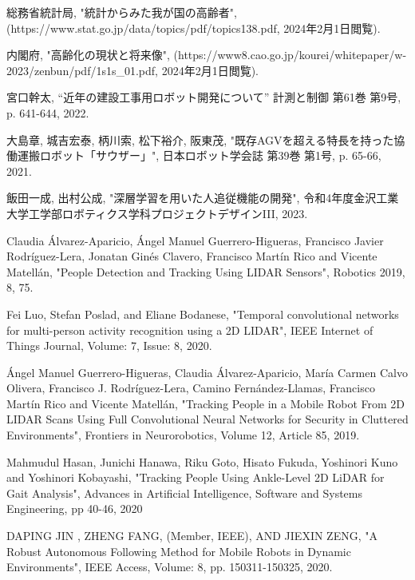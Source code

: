 \begin{thebibliography}{99}
    総務省統計局, "統計からみた我が国の高齢者", (https://www.stat.go.jp/data/topics/pdf/topics138.pdf, 2024年2月1日閲覧).

    内閣府, "高齢化の現状と将来像", (https://www8.cao.go.jp/kourei/whitepaper/w-2023/zenbun/pdf/1s1s\_01.pdf, 2024年2月1日閲覧).
    
    宮口幹太, “近年の建設工事用ロボット開発について” 計測と制御 第61巻 第9号, p. 641-644, 2022.
    
    大島章, 城吉宏泰, 柄川索, 松下裕介, 阪東茂, "既存AGVを超える特長を持った協働運搬ロボット「サウザー」", 日本ロボット学会誌 第39巻 第1号, p. 65-66, 2021.

    飯田一成, 出村公成, "深層学習を用いた人追従機能の開発", 
    令和4年度金沢工業大学工学部ロボティクス学科プロジェクトデザインI\hspace{-1.2pt}I\hspace{-1.2pt}I,
    2023.

    Claudia Álvarez-Aparicio, Ángel Manuel Guerrero-Higueras, 
    Francisco Javier Rodríguez-Lera, Jonatan Ginés Clavero, 
    Francisco Martín Rico and Vicente Matellán, 
    "People Detection and Tracking Using LIDAR Sensors",
    Robotics 2019, 8, 75.

    Fei Luo, Stefan Poslad, and Eliane Bodanese,
    "Temporal convolutional networks for multi-person activity recognition using a 2D LIDAR",
    IEEE Internet of Things Journal, Volume: 7, Issue: 8, 2020.

    Ángel Manuel Guerrero-Higueras, Claudia Álvarez-Aparicio, 
    María Carmen Calvo Olivera, Francisco J. Rodríguez-Lera, 
    Camino Fernández-Llamas, Francisco Martín Rico and Vicente Matellán,
    "Tracking People in a Mobile Robot From 2D LIDAR Scans Using Full Convolutional Neural Networks for Security in Cluttered Environments",
    Frontiers in Neurorobotics, Volume 12, Article 85, 2019.

    Mahmudul Hasan, Junichi Hanawa, Riku Goto, Hisato Fukuda, 
    Yoshinori Kuno and Yoshinori Kobayashi,
    "Tracking People Using Ankle-Level 2D LiDAR for Gait Analysis",
    Advances in Artificial Intelligence, Software and Systems Engineering,
    pp 40-46, 2020

    DAPING JIN , ZHENG FANG, (Member, IEEE), AND JIEXIN ZENG, 
    "A Robust Autonomous Following Method for Mobile Robots in Dynamic Environments", 
    IEEE Access, Volume: 8, pp. 150311-150325, 2020.

\end{thebibliography}
